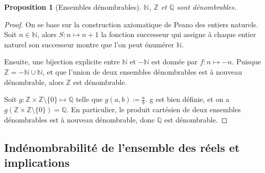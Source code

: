 \documentclass[french]{article}
\theoremstyle{definition}
\theoremstyle{plain}
\newtheorem{proposition}[subsubsection]{Proposition}
\theoremstyle{plain}
\theoremstyle{plain}
\theoremstyle{plain}
\theoremstyle{plain}
\begin{document}
\begin{proposition}[Ensembles dénombrables]
	\( \mathbb{N} \), \( \mathbb{Z} \) et \( \mathbb{Q} \) sont dénombrables. \cite{tao2014analysis}
\end{proposition}
\begin{proof}
	On se base sur la construction axiomatique de Peano des entiers naturels. 
	Soit \( n \in \mathbb{N} \), alors \( S : n \mapsto n+1 \) la fonction successeur qui assigne à chaque entier naturel son successeur montre que l'on peut énumérer \( \mathbb{N} \).
	
	\par Ensuite, une bijection explicite entre \( \mathbb{N} \) et \( \mathbb{-N} \) est donnée par \( f : n \mapsto -n \). Puisque \( \mathbb{Z} = \mathbb{-N} \cup \mathbb{N} \), et que l'union de deux ensembles dénombrables est à nouveau dénombrable, alors \( \mathbb{Z} \) est dénombrable.
	
	\par Soit \( g : \mathbb{Z} \times \mathbb{Z} \setminus \{0\} \mapsto \mathbb{Q} \) telle que \( g(a,b) \coloneqq \frac{a}{b} \). g est bien définie, et on a \( g(\mathbb{Z} \times \mathbb{Z} \setminus \{0\} ) = \mathbb{Q} \). En particulier, le produit cartésien de deux ensembles dénombrables est à nouveau dénombrable, donc \( \mathbb{Q} \) est dénombrable.

\end{proof}

\subsection{Indénombrabilité de l'ensemble des réels et implications}
\end{document}
